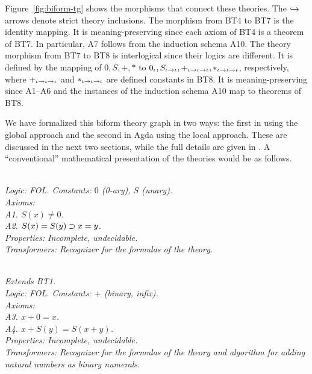 \documentclass[fleqn]{llncs}
\newcommand{\appendicesref}[2]
  {\iftoggle{cicm}
    {appendices #1 and #2 of \cite{CaretteFarmerArxiv17}}
    {appendices #1 and #2}%
  }
\begin{document}
Figure~\ref{fig:biform-tg} shows the morphisms that connect these
theories.  The $\hookrightarrow$ arrows denote strict theory inclusions.
The morphism from BT4 to BT7 is the identity mapping.  It is
meaning-preserving since each axiom of BT4 is a theorem of BT7.  In
particular, A7 follows from the induction schema A10.  The theory
morphism from BT7 to BT8 is interlogical since their logics are
different.  It is defined by the mapping of $0, S, +, *$ to $0_\iota,
S_{\iota \rightarrow \iota}, +_{\iota \rightarrow \iota \rightarrow \iota},
*_{\iota \rightarrow \iota \rightarrow \iota}$, respectively, where $+_{\iota
  \rightarrow \iota \rightarrow \iota}$ and $*_{\iota \rightarrow \iota \rightarrow
  \iota}$ are defined constants in BT8. It is meaning-preserving since
A1--A6 and the instances of the induction schema A10 map to theorems
of BT8.

We have formalized this biform theory graph in two ways: the first in
{\churchuqe} using the global approach and the second in Agda using
the local approach.  These are discussed in the next
two sections, while the full details are given in \appendicesref{A}{B}.
A ``conventional'' mathematical presentation of the theories would be
as follows.

\begin{biformthy}\em\ \\
\emph{Logic}: FOL. \emph{Constants}: $0$ (0-ary), $S$ (unary).\\
\emph{Axioms}:\\
\indent A1. $S(x) \not= 0$.\\
\indent A2. $S(x) = S(y) \supset x = y$.\\
\emph{Properties}: Incomplete, undecidable.\\
\emph{Transformers}: Recognizer for the formulas of the theory.
\end{biformthy}

\begin{biformthy}\em\ \\
Extends BT1.\\
\emph{Logic}: FOL. \emph{Constants}: $+$ (binary, infix).\\
\emph{Axioms}:\\
\indent A3. $x + 0 = x$.\\
\indent A4. $x + S(y) = S(x + y)$.\\
\emph{Properties}: Incomplete, undecidable.\\
\emph{Transformers}: Recognizer for the formulas of the theory and  
algorithm for adding natural numbers as binary numerals.
\end{biformthy}
\end{document}
